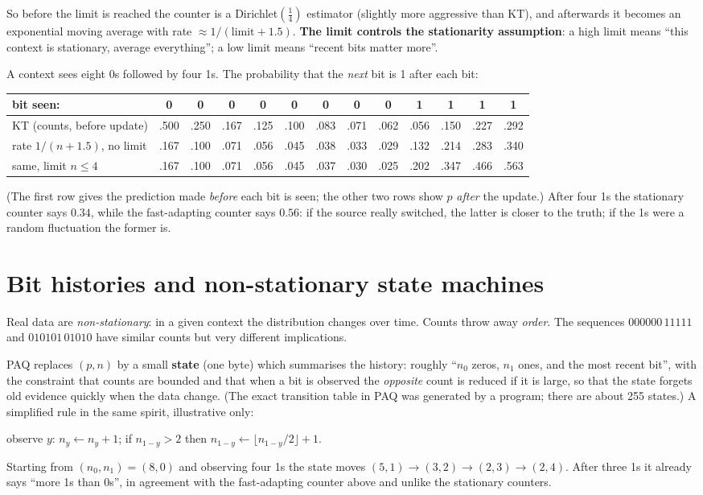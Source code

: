 \documentclass[11pt,a4paper,openany]{book}
\theoremstyle{definition}
\theoremstyle{remark}
\begin{document}
So before the limit is reached the counter is a Dirichlet$(\tfrac14)$ estimator (slightly more aggressive than KT), and afterwards it becomes an exponential moving average with rate $\approx1/(\text{limit}+1.5)$. \textbf{The limit controls the stationarity assumption}: a high limit means ``this context is stationary, average everything''; a low limit means ``recent bits matter more''.

\begin{example}
A context sees eight 0s followed by four 1s. The probability that the \emph{next} bit is 1 after each bit:
\begin{center}
\small
\scriptsize\setlength{\tabcolsep}{3pt}
\begin{tabular}{@{}lcccccccccccc@{}}
\toprule
bit seen: & 0&0&0&0&0&0&0&0&1&1&1&1\\
\midrule
KT (counts, before update) & .500&.250&.167&.125&.100&.083&.071&.062&.056&.150&.227&.292\\
rate $1/(n{+}1.5)$, no limit & .167&.100&.071&.056&.045&.038&.033&.029&.132&.214&.283&.340\\
same, limit $n\le4$ & .167&.100&.071&.056&.045&.037&.030&.025&.202&.347&.466&.563\\
\bottomrule
\end{tabular}
\end{center}
(The first row gives the prediction made \emph{before} each bit is seen; the other two rows show $p$ \emph{after} the update.) After four 1s the stationary counter says $0.34$, while the fast-adapting counter says $0.56$: if the source really switched, the latter is closer to the truth; if the 1s were a random fluctuation the former is.
\end{example}

\section{Bit histories and non-stationary state machines}

Real data are \emph{non-stationary}: in a given context the distribution changes over time. Counts throw away \emph{order}. The sequences $000000\,11111$ and $010101\,01010$ have similar counts but very different implications.

PAQ replaces $(p,n)$ by a small \textbf{state} (one byte) which summarises the history: roughly ``$n_0$ zeros, $n_1$ ones, and the most recent bit'', with the constraint that counts are bounded and that when a bit is observed the \emph{opposite} count is reduced if it is large, so that the state forgets old evidence quickly when the data change. (The exact transition table in PAQ was generated by a program; there are about 255 states.) A simplified rule in the same spirit, illustrative only:
\begin{center}
observe $y$: $n_y\leftarrow n_y+1$; if $n_{1-y}>2$ then $n_{1-y}\leftarrow\lfloor n_{1-y}/2\rfloor+1$.
\end{center}
Starting from $(n_0,n_1)=(8,0)$ and observing four 1s the state moves $(5,1)\to(3,2)\to(2,3)\to(2,4)$. After three 1s it already says ``more 1s than 0s'', in agreement with the fast-adapting counter above and unlike the stationary counters.
\end{document}
